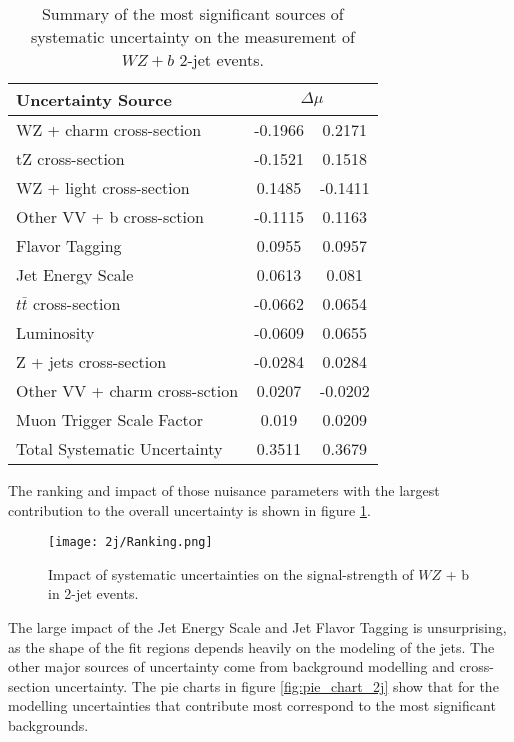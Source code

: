 \begin{table}[H]
    \centering
    \begin{tabular}{l|cc}
        \hline\hline
        Uncertainty Source & \multicolumn{2}{c}{$\Delta \mu$ }  \\
        \hline
        WZ + charm cross-section & -0.1966 & 0.2171 \\
        tZ cross-section & -0.1521 & 0.1518 \\
        WZ + light cross-section & 0.1485 & -0.1411 \\
        Other VV + b cross-sction & -0.1115 & 0.1163 \\
        Flavor Tagging & 0.0955 & 0.0957 \\
        Jet Energy Scale & 0.0613 & 0.081 \\
        $t\bar{t}$ cross-section & -0.0662 & 0.0654 \\
        Luminosity & -0.0609 & 0.0655 \\
        Z + jets cross-section & -0.0284 & 0.0284 \\
        Other VV + charm cross-sction & 0.0207 & -0.0202 \\
        Muon Trigger Scale Factor & 0.019 & 0.0209 \\
        \hline
        Total Systematic Uncertainty & 0.3511 & 0.3679 \\
        \hline\hline
    \end{tabular}
    \caption{Summary of the most significant sources of systematic uncertainty on the measurement of $WZ+b$ 2-jet events.}
    \label{tab:systematics_2j}
\end{table}

The ranking and impact of those nuisance parameters with the largest contribution to the overall uncertainty is shown in figure \ref{fig:ranking_2j}.

\begin{figure}[H]
    \centering
    \texttt{[image: 2j/Ranking.png]}
    \caption{Impact of systematic uncertainties on the signal-strength of $WZ$ + b in 2-jet events.}
    \label{fig:ranking_2j}
\end{figure}

The large impact of the Jet Energy Scale and Jet Flavor Tagging is unsurprising, as the shape of the fit regions depends heavily on the modeling of the jets. The other major sources of uncertainty come from background modelling and cross-section uncertainty. The pie charts in figure \ref{fig:pie_chart_2j} show that for the modelling uncertainties that contribute most correspond to the most significant backgrounds. %


